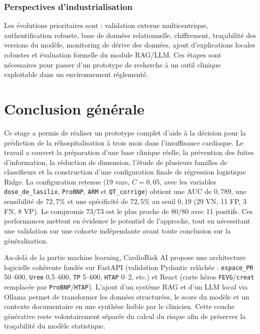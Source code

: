 \documentclass[12pt,a4paper]{report}
\begin{document}
\subsection{Perspectives d'industrialisation}

Les évolutions prioritaires sont : validation externe multicentrique, authentification
robuste, base de données relationnelle, chiffrement, traçabilité des versions du modèle,
monitoring de dérive des données, ajout d'explications locales robustes et évaluation
formelle du module RAG/LLM. Ces étapes sont nécessaires pour passer d'un prototype de
recherche à un outil clinique exploitable dans un environnement réglementé.


\chapter*{Conclusion générale}

Ce stage a permis de réaliser un prototype complet d'aide à la décision pour la
prédiction de la réhospitalisation à trois mois dans l'insuffisance cardiaque. Le travail a
couvert la préparation d'une base clinique réelle, la prévention des fuites d'information,
la réduction de dimension, l'étude de plusieurs familles de classifieurs et la construction
d'une configuration finale de régression logistique Ridge. La configuration retenue (19 vars, $C=0{,}05$, avec les variables \texttt{dose\_de\_lasilix}, \texttt{ProBNP}, \texttt{ARM} et \texttt{QT\_corrige}) obtient une AUC de $0{,}789$, une sensibilité de $72{,}7\%$ et une spécificité de
$72{,}5\%$ au seuil $0{,}19$ (29 VN, 11 FP, 3 FN, 8 VP). Le compromis $73/73$ est le plus proche de $80/80$ avec 11 positifs. Ces performances mettent en évidence le
potentiel de l'approche, tout en nécessitant une validation sur une cohorte indépendante
avant toute conclusion sur la généralisation.

Au-delà de la partie machine learning, CardioRisk AI propose une architecture logicielle
cohérente fondée sur FastAPI (validation Pydantic relâchée : \texttt{espace\_PR} 50--600, \texttt{Uree} 0,5--600, \texttt{TP} 5--600, \texttt{HTAP} 0--2, etc.) et React (carte héros \texttt{FEVG}/\texttt{creat} remplacée par \texttt{ProBNP}/\texttt{HTAP}). L'ajout d'un système RAG et d'un LLM local via
Ollama permet de transformer les données structurées, le score du modèle et un contexte
documentaire en une synthèse lisible par le clinicien. Cette couche générative reste
volontairement séparée du calcul du risque afin de préserver la traçabilité du modèle
statistique.
\end{document}
